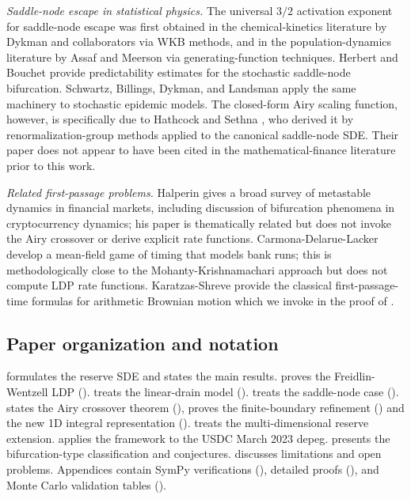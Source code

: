 \documentclass[11pt,a4paper]{article}
\theoremstyle{plain}
\theoremstyle{definition}
\begin{document}
\emph{Saddle-node escape in statistical physics.}
The universal $3/2$ activation exponent for saddle-node escape was first obtained in the chemical-kinetics literature by Dykman and collaborators \cite{DykmanMoriRossHunt1994} via WKB methods, and in the population-dynamics literature by Assaf and Meerson \cite{AssafMeerson2010} via generating-function techniques.
Herbert and Bouchet \cite{HerbertBouchet2017} provide predictability estimates for the stochastic saddle-node bifurcation.
Schwartz, Billings, Dykman, and Landsman \cite{SchwartzBillingsDykmanLandsman2009} apply the same machinery to stochastic epidemic models.
The closed-form Airy scaling function, however, is specifically due to Hathcock and Sethna \cite{HathcockSethna2021}, who derived it by renormalization-group methods applied to the canonical saddle-node SDE.
Their paper does not appear to have been cited in the mathematical-finance literature prior to this work.

\emph{Related first-passage problems.}
Halperin \cite{Halperin2025} gives a broad survey of metastable dynamics in financial markets, including discussion of bifurcation phenomena in cryptocurrency dynamics; his paper is thematically related but does not invoke the Airy crossover or derive explicit rate functions.
Carmona-Delarue-Lacker \cite{CarmonaDelarueLacker2017} develop a mean-field game of timing that models bank runs; this is methodologically close to the Mohanty-Krishnamachari \cite{MohantyKrishnamachari2026} approach but does not compute LDP rate functions.
Karatzas-Shreve \cite{KaratzasShreve1991} provide the classical first-passage-time formulas for arithmetic Brownian motion which we invoke in the proof of .

\subsection{Paper organization and notation}

 formulates the reserve SDE and states the main results.
 proves the Freidlin-Wentzell LDP ().
 treats the linear-drain model ().
 treats the saddle-node case ().
 states the Airy crossover theorem (), proves the finite-boundary refinement () and the new 1D integral representation ().
 treats the multi-dimensional reserve extension.
 applies the framework to the USDC March 2023 depeg.
 presents the bifurcation-type classification and conjectures.
 discusses limitations and open problems.
Appendices contain SymPy verifications (), detailed proofs (), and Monte Carlo validation tables ().
\end{document}
